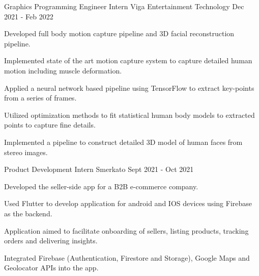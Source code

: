 

\begin{cventries}

  \cventry
    {Graphics Programming Engineer Intern} %
    {Viga Entertainment Technology} %
    {Dec 2021 - Feb 2022} %
    {} %
    {
      \begin{cvitems} %
        \item {Developed full body motion capture pipeline and 3D facial reconstruction pipeline.}
        \item {Implemented state of the art motion capture system to capture detailed human motion including muscle deformation.}
        \item {Applied a neural network based pipeline using TensorFlow to extract key-points from a series of frames.}
        \item {Utilized optimization methods to fit statistical human body models to extracted points to capture fine details.}
        \item {Implemented a pipeline to construct detailed 3D model of human faces from stereo images.}
      \end{cvitems}
    }

  \cventry
    {Product Development Intern} %
    {Smerkato} %
    {Sept 2021 - Oct 2021} %
    {} %
    {
      \begin{cvitems} %
        \item {Developed the seller-side app for a B2B e-commerce company.}
        \item {Used Flutter to develop application for android and IOS devices using Firebase as the backend.}
        \item {Application aimed to facilitate onboarding of sellers, listing products, tracking orders and delivering insights.}
        \item {Integrated Firebase (Authentication, Firestore and Storage), Google Maps and Geolocator APIs into the app.}
      \end{cvitems}
    }

\end{cventries}
